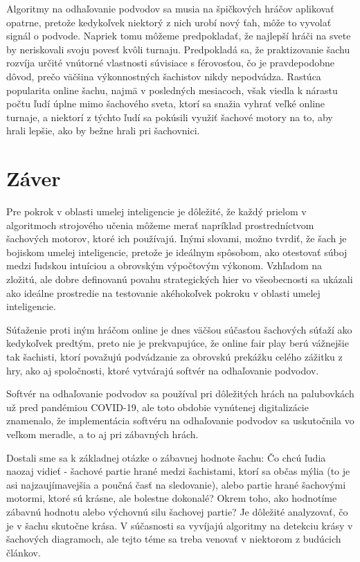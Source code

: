 \documentclass[10pt,twoside,slovak,a4paper]{article}
\begin{document}
Algoritmy na odhaľovanie podvodov sa musia na špičkových hráčov aplikovať opatrne, pretože kedykoľvek niektorý z nich urobí nový ťah, môže to vyvolať signál o podvode. Napriek tomu môžeme predpokladať, že najlepší hráči na svete by neriskovali svoju povesť kvôli turnaju. Predpokladá sa, že praktizovanie šachu rozvíja určité vnútorné vlastnosti súvisiace s férovosťou, čo je pravdepodobne dôvod, prečo väčšina výkonnostných šachistov nikdy nepodvádza. Rastúca popularita online šachu, najmä v posledných mesiacoch, však viedla k nárastu počtu ľudí úplne mimo šachového sveta, ktorí sa snažia vyhrať veľké online turnaje, a niektorí z týchto ľudí sa pokúsili využiť šachové motory na to, aby hrali lepšie, ako by bežne hrali pri šachovnici.







\section{Záver}

Pre pokrok v oblasti umelej inteligencie je dôležité, že každý prielom v algoritmoch strojového učenia môžeme merať napríklad prostredníctvom šachových motorov, ktoré ich používajú. Inými slovami, možno tvrdiť, že šach je bojiskom umelej inteligencie, pretože je ideálnym spôsobom, ako otestovať súboj medzi ľudskou intuíciou a obrovským výpočtovým výkonom. Vzhľadom na zložitú, ale dobre definovanú povahu strategických hier vo všeobecnosti sa ukázali ako ideálne prostredie na testovanie akéhokoľvek pokroku v oblasti umelej inteligencie.

Súťaženie proti iným hráčom online je dnes väčšou súčasťou šachových súťaží ako kedykoľvek predtým, preto nie je prekvapujúce, že online fair play berú vážnejšie tak šachisti, ktorí považujú podvádzanie za obrovskú prekážku celého zážitku z hry, ako aj spoločnosti, ktoré vytvárajú softvér na odhaľovanie podvodov.

Softvér na odhaľovanie podvodov sa používal pri dôležitých hrách na palubovkách už pred pandémiou COVID-19, ale toto obdobie vynútenej digitalizácie znamenalo, že implementácia softvéru na odhaľovanie podvodov sa uskutočnila vo veľkom meradle, a to aj pri zábavných hrách.

Dostali sme sa k základnej otázke o zábavnej hodnote šachu: Čo chcú ľudia naozaj vidieť - šachové partie hrané medzi šachistami, ktorí sa občas mýlia (to je asi najzaujímavejšia a poučná časť na sledovanie), alebo partie hrané šachovými motormi, ktoré sú krásne, ale bolestne dokonalé? Okrem toho, ako hodnotíme zábavnú hodnotu alebo výchovnú silu šachovej partie? Je dôležité analyzovať, čo je v šachu skutočne krása. V súčasnosti sa vyvíjajú algoritmy na detekciu krásy v šachových diagramoch, ale tejto téme sa treba venovať v niektorom z budúcich článkov.









\end{document}
